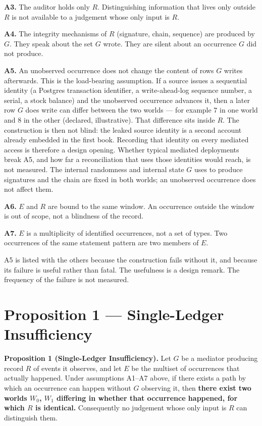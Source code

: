 \documentclass[11pt]{article}
\begin{document}
\textbf{A3.} The auditor holds only $R$. Distinguishing information that lives only outside $R$ is not available to a judgement whose only input is $R$.

\textbf{A4.} The integrity mechanisms of $R$ (signature, chain, sequence) are produced by $G$. They speak about the set $G$ wrote. They are silent about an occurrence $G$ did not produce.

\textbf{A5.} An unobserved occurrence does not change the content of rows $G$ writes afterwards. This is the load-bearing assumption. If a source issues a sequential identity (a Postgres transaction identifier, a write-ahead-log sequence number, a serial, a stock balance) and the unobserved occurrence advances it, then a later row $G$ does write can differ between the two worlds --- for example $7$ in one world and $8$ in the other (declared, illustrative). That difference sits inside $R$. The construction is then not blind: the leaked source identity is a second account already embedded in the first book. Recording that identity on every mediated access is therefore a design opening. Whether typical mediated deployments break A5, and how far a reconciliation that uses those identities would reach, is not measured. The internal randomness and internal state $G$ uses to produce signatures and the chain are fixed in both worlds; an unobserved occurrence does not affect them.

\textbf{A6.} $E$ and $R$ are bound to the same window. An occurrence outside the window is out of scope, not a blindness of the record.

\textbf{A7.} $E$ is a multiplicity of identified occurrences, not a set of types. Two occurrences of the same statement pattern are two members of $E$.

A5 is listed with the others because the construction fails without it, and because its failure is useful rather than fatal. The usefulness is a design remark. The frequency of the failure is not measured.

\section{Proposition 1 --- Single-Ledger Insufficiency}

\textbf{Proposition 1 (Single-Ledger Insufficiency).}
Let $G$ be a mediator producing record $R$ of events it observes, and let $E$ be the multiset of occurrences that actually happened. Under assumptions A1--A7 above, if there exists a path by which an occurrence can happen without $G$ observing it, then \textbf{there exist two worlds $W_0$, $W_1$ differing in whether that occurrence happened, for which $R$ is identical.} Consequently no judgement whose only input is $R$ can distinguish them.
\end{document}
